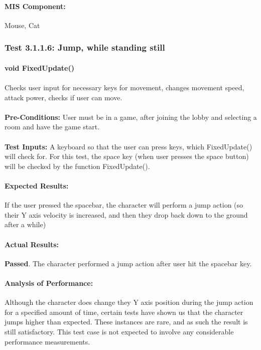 \documentclass{article}
\begin{document}
    \paragraph{MIS Component:} Mouse, Cat 
    
    \subsubsection{Test 3.1.1.6: Jump, while standing still}
    \paragraph{}\textbf{void FixedUpdate()}
    \paragraph{} Checks user input for necessary keys for movement, changes movement speed, attack power, checks if user can move.
    \paragraph{}\textbf{Pre-Conditions:} User must be in a game, after joining the lobby and selecting a room and have the game start.
    \paragraph{}\textbf{Test Inputs:} A keyboard so that the user can press keys, which FixedUpdate() will check for. For this test, the space key (when user presses the space button) will be checked by the function FixedUpdate(). 
    \paragraph{Expected Results:} If the user pressed the spacebar, the character will perform a jump action (so their Y axis velocity is increased, and then they drop back down to the ground after a while)
    \paragraph{Actual Results:} \textbf{Passed}. The character performed a jump action after user hit the spacebar key.
    \paragraph{Analysis of Performance:} Although the character does change they Y axis position during the jump action for a specified amount of time, certain tests have shown us that the character jumps higher than expected. These instances are rare, and as such the result is still satisfactory. This test case is not expected to involve any considerable performance measurements.
\end{document}
